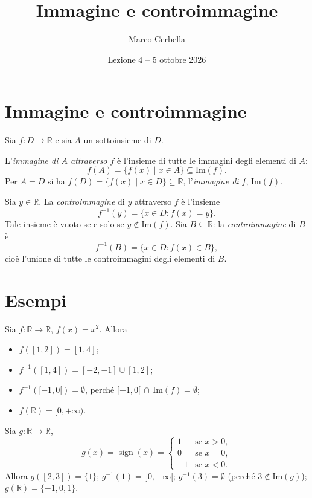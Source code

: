 \documentclass[11pt,a4paper]{article}
\title{Immagine e controimmagine}
\author{Marco Cerbella}
\date{Lezione 4 -- 5 ottobre 2026}
\begin{document}
\maketitle

\section{Immagine e controimmagine}

Sia $f : D \to \mathbb{R}$ e sia $A$ un sottoinsieme di $D$.

\begin{definizione}
L'\emph{immagine di $A$ attraverso $f$} è l'insieme di tutte le immagini degli elementi di $A$:
\[
f(A) = \{f(x) \mid x \in A\} \subseteq \mathrm{Im}(f).
\]
Per $A = D$ si ha $f(D) = \{f(x) \mid x \in D\} \subseteq \mathbb{R}$, l'\emph{immagine di $f$}, $\mathrm{Im}(f)$.
\end{definizione}

\begin{definizione}
Sia $y \in \mathbb{R}$. La \emph{controimmagine} di $y$ attraverso $f$ è l'insieme
\[
f^{-1}(y) = \{x \in D : f(x) = y\}.
\]
Tale insieme è vuoto se e solo se $y \notin \mathrm{Im}(f)$. Sia $B \subseteq \mathbb{R}$: la \emph{controimmagine} di $B$ è
\[
f^{-1}(B) = \{x \in D : f(x) \in B\},
\]
cioè l'unione di tutte le controimmagini degli elementi di $B$.
\end{definizione}

\section{Esempi}

\begin{esempio}[$f(x) = x^2$]
Sia $f : \mathbb{R} \to \mathbb{R}$, $f(x) = x^2$. Allora
\begin{itemize}
    \item $f([1, 2]) = [1, 4]$;
    \item $f^{-1}([1, 4]) = [-2, -1] \cup [1, 2]$;
    \item $f^{-1}([-1, 0[) = \emptyset$, perché $[-1, 0[ \,\cap\, \mathrm{Im}(f) = \emptyset$;
    \item $f(\mathbb{R}) = [0, +\infty)$.
\end{itemize}
\end{esempio}

\begin{esempio}
Sia $g : \mathbb{R} \to \mathbb{R}$,
\[
g(x) = \operatorname{sign}(x) = \begin{cases} 1 & \text{se } x > 0, \\ 0 & \text{se } x = 0, \\ -1 & \text{se } x < 0. \end{cases}
\]
Allora $g([2, 3]) = \{1\}$; $g^{-1}(1) = \,]0, +\infty[$; $g^{-1}(3) = \emptyset$ (perché $3 \notin \mathrm{Im}(g)$); $g(\mathbb{R}) = \{-1, 0, 1\}$.
\end{esempio}
\end{document}
